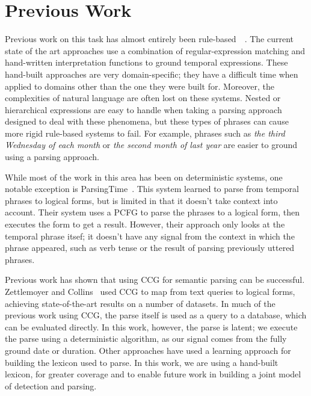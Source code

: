 \section{Previous Work}
\label{sec:previousWork}
Previous work on this task has almost entirely been rule-based~\cite{HeidelTime}~\cite{SUTime}. The current state of the art approaches use a combination of regular-expression matching and hand-written interpretation functions to ground temporal expressions. These hand-built approaches are very domain-specific; they have a difficult time when applied to domains other than the one they were built for. Moreover, the complexities of natural language are often lost on these systems. Nested or hierarchical expressions are easy to handle when taking a parsing approach designed to deal with these phenomena, but these types of phrases can cause more rigid rule-based systems to fail. For example, phrases such as \emph{the third Wednesday of each month} or \emph{the second month of last year} are easier to ground using a parsing approach. 

While most of the work in this area has been on deterministic systems, one notable exception is ParsingTime~\cite{ParsingTime}. This system learned to parse from temporal phrases to logical forms, but is limited in that it doesn't take context into account. Their system uses a PCFG to parse the phrases to a logical form, then executes the form to get a result. However, their approach only looks at the temporal phrase itsef; it doesn't have any signal from the context in which the phrase appeared, such as verb tense or the result of parsing previously uttered phrases.

Previous work has shown that using CCG for semantic parsing can be successful. Zettlemoyer and Collins~\cite{LukeFirstPaper} used CCG to map from text queries to logical forms, achieving state-of-the-art results on a number of datasets. In much of the previous work using CCG, the parse itself is used as a query to a database, which can be evaluated directly. In this work, however, the parse is latent; we execute the parse using a deterministic algorithm, as our signal comes from the fully ground date or duration. Other approaches have used a learning approach for building the lexicon used to parse. In this work, we are using a hand-built lexicon, for greater coverage and to enable future work in building a joint model of detection and parsing.

